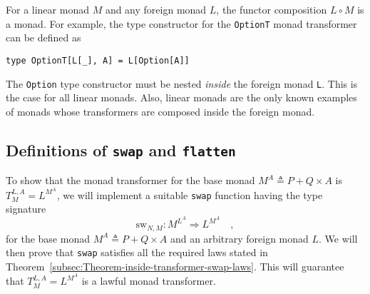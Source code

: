For a linear monad $M$ and any foreign monad $L$, the functor composition
$L\circ M$ is a monad. For example, the type constructor for the
\lstinline!OptionT! monad
transformer can be defined as
\begin{lstlisting}
type OptionT[L[_], A] = L[Option[A]]
\end{lstlisting}
The \lstinline!Option!
type constructor must be nested \emph{inside} the foreign monad \lstinline!L!.
This is the case for all linear monads. Also, linear monads are the
only known examples of monads whose transformers are composed inside
the foreign monad.

\subsection{Definitions of \texttt{swap} and \texttt{flatten}}

To show that the monad transformer for the base monad $M^{A}\triangleq P+Q\times A$
is $T_{M}^{L,A}=L^{M^{A}}$, we will implement a suitable \lstinline!swap!
function having the type signature
\[
\text{sw}_{N,M}:M^{L^{A}}\Rightarrow L^{M^{A}}\quad,
\]
for the base monad $M^{A}\triangleq P+Q\times A$ and an arbitrary
foreign monad $L$. We will then prove that \lstinline!swap!
satisfies all the required laws stated in Theorem~\ref{subsec:Theorem-inside-transformer-swap-laws}.
This will guarantee that $T_{M}^{L,A}=L^{M^{A}}$ is a lawful monad
transformer.

